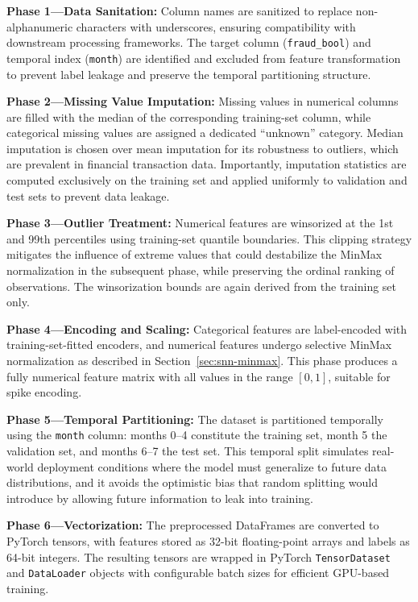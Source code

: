 \textbf{Phase 1---Data Sanitation:} Column names are sanitized to replace non-alphanumeric characters with underscores, ensuring compatibility with downstream processing frameworks. The target column (\texttt{fraud\_bool}) and temporal index (\texttt{month}) are identified and excluded from feature transformation to prevent label leakage and preserve the temporal partitioning structure.

\textbf{Phase 2---Missing Value Imputation:} Missing values in numerical columns are filled with the median of the corresponding training-set column, while categorical missing values are assigned a dedicated ``unknown'' category. Median imputation is chosen over mean imputation for its robustness to outliers, which are prevalent in financial transaction data. Importantly, imputation statistics are computed exclusively on the training set and applied uniformly to validation and test sets to prevent data leakage.

\textbf{Phase 3---Outlier Treatment:} Numerical features are winsorized at the 1st and 99th percentiles using training-set quantile boundaries. This clipping strategy mitigates the influence of extreme values that could destabilize the MinMax normalization in the subsequent phase, while preserving the ordinal ranking of observations. The winsorization bounds are again derived from the training set only.

\textbf{Phase 4---Encoding and Scaling:} Categorical features are label-encoded with training-set-fitted encoders, and numerical features undergo selective MinMax normalization as described in Section~\ref{sec:snn-minmax}. This phase produces a fully numerical feature matrix with all values in the range $[0, 1]$, suitable for spike encoding.

\textbf{Phase 5---Temporal Partitioning:} The dataset is partitioned temporally using the \texttt{month} column: months 0--4 constitute the training set, month 5 the validation set, and months 6--7 the test set. This temporal split simulates real-world deployment conditions where the model must generalize to future data distributions, and it avoids the optimistic bias that random splitting would introduce by allowing future information to leak into training.

\textbf{Phase 6---Vectorization:} The preprocessed DataFrames are converted to PyTorch tensors, with features stored as 32-bit floating-point arrays and labels as 64-bit integers. The resulting tensors are wrapped in PyTorch \texttt{TensorDataset} and \texttt{DataLoader} objects with configurable batch sizes for efficient GPU-based training.


